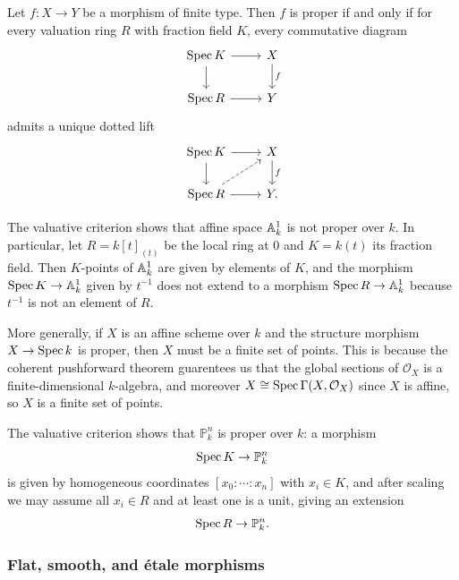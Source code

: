 \documentclass[12pt]{article}
\begin{document}
\begin{theorem}
    Let $f:X\to Y$ be a morphism of finite type. Then $f$ is proper if and only if for every valuation ring $R$ with fraction field $K$, every commutative diagram
    \[
        \begin{tikzcd}
            \Spec K \arrow[r] \arrow[d] & X \arrow[d, "f"] \\
            \Spec R \arrow[r] & Y
        \end{tikzcd}
    \]
    admits a unique dotted lift
    \[
        \begin{tikzcd}
            \Spec K \arrow[r] \arrow[d] & X \arrow[d, "f"] \\
            \Spec R \arrow[r] \arrow[ur, dashed] & Y.
        \end{tikzcd}
    \]
\end{theorem}

\begin{example}
    The valuative criterion shows that affine space $\mathbb{A}^1_k$ is not proper over $k$. In particular, let $R = k[t]_{(t)}$ be the local ring at $0$ and $K = k(t)$ its fraction field. Then $K$-points of $\mathbb{A}^1_k$ are given by elements of $K$, and the morphism $\operatorname{Spec} K \to \mathbb{A}^1_k$ given by $t^{-1}$ does not extend to a morphism $\operatorname{Spec} R \to \mathbb{A}^1_k$ because $t^{-1}$ is not an element of $R$.

    More generally, if $X$ is an affine scheme over $k$ and the structure morphism $X\to \operatorname{Spec} k$ is proper, then $X$ must be a finite set of points. This is because the coherent pushforward theorem guarentees us that the global sections of $\mathcal O_X$ is a finite-dimensional $k$-algebra, and moreover $X \cong \operatorname{Spec} \Gamma(X,\mathcal O_X)$ since $X$ is affine, so $X$ is a finite set of points.
\end{example}

\begin{example}
    The valuative criterion shows that $\mathbb P^n_k$ is proper over $k$: a morphism
    \[
        \operatorname{Spec} K \to \mathbb P^n_k
    \]
    is given by homogeneous coordinates $[x_0:\cdots:x_n]$ with $x_i\in K$, and after scaling we may assume all $x_i\in R$ and at least one is a unit, giving an extension
    \[
        \operatorname{Spec} R \to \mathbb P^n_k.
    \]
\end{example}


\subsubsection{Flat, smooth, and étale morphisms}
\end{document}
